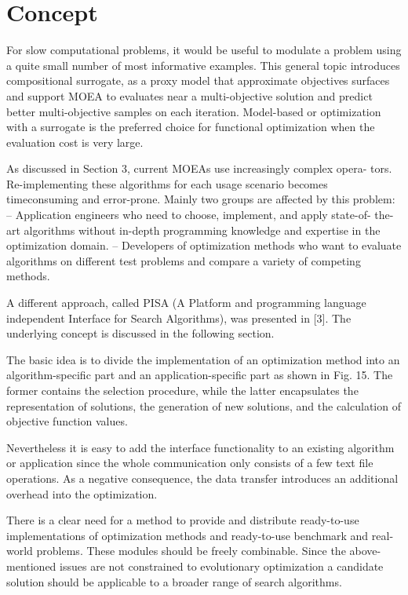 \chapter{Concept}

    For slow computational problems, it would be useful to modulate a problem using a quite small number of most informative examples. This general topic introduces compositional surrogate, as a proxy model that approximate objectives surfaces and support MOEA to evaluates near a multi-objective solution and predict better multi-objective samples on each iteration.
    Model-based or optimization with a surrogate is the preferred choice for functional optimization when the evaluation cost is very large.

    As discussed in Section 3, current MOEAs use increasingly complex opera- tors. Re-implementing these algorithms for each usage scenario becomes 
    timeconsuming and error-prone. Mainly two groups are affected by this problem:
    – Application engineers who need to choose, implement, and apply state-of- the-art algorithms without in-depth programming knowledge and expertise in the optimization domain.
    – Developers of optimization methods who want to evaluate algorithms on different test problems and compare a variety of competing methods.


    A different approach, called PISA (A Platform and programming language independent Interface for Search Algorithms), was presented in [3]. 
    The underlying concept is discussed in the following section.

    The basic idea is to divide the implementation of an optimization method into an algorithm-specific part and an application-specific part as shown in Fig. 15. 
    The former contains the selection procedure, while the latter encapsulates the representation of solutions, the generation of new solutions, 
    and the calculation of objective function values.

    Nevertheless it is easy to add the interface functionality to an existing algorithm or application since the whole communication only consists of a few text file operations.
    As a negative consequence, the data transfer introduces an additional overhead into the optimization.

    There is a clear need for a method to provide and distribute ready-to-use implementations of optimization methods and ready-to-use benchmark and real- world problems. 
    These modules should be freely combinable. Since the above- mentioned issues are not constrained to evolutionary optimization a 
    candidate solution should be applicable to a broader range of search algorithms.


